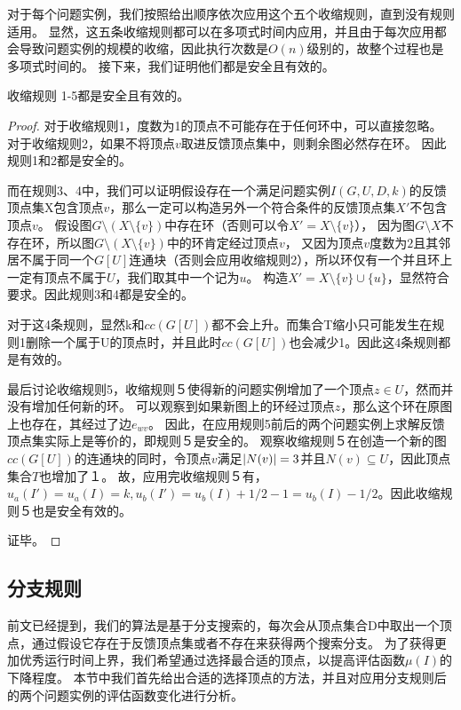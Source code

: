 对于每个问题实例，我们按照给出顺序依次应用这个五个收缩规则，直到没有规则适用。
显然，这五条收缩规则都可以在多项式时间内应用，并且由于每次应用都会导致问题实例的规模的收缩，因此执行次数是$O(n)$级别的，故整个过程也是多项式时间的。
接下来，我们证明他们都是安全且有效的。

\begin{lemma}
收缩规则 1-5都是安全且有效的。
\end{lemma}
\begin{proof}
对于收缩规则1，度数为1的顶点不可能存在于任何环中，可以直接忽略。
对于收缩规则2，如果不将顶点$v$取进反馈顶点集中，则剩余图必然存在环。
因此规则1和2都是安全的。

而在规则3、4中，我们可以证明假设存在一个满足问题实例$I(G, U, D, k)$的反馈顶点集X包含顶点$v$，那么一定可以构造另外一个符合条件的反馈顶点集$X'$不包含顶点$v$。
假设图$G \setminus (X \setminus \{v\})$中存在环（否则可以令$X' = X \setminus \{v\}$），
因为图$G \setminus X$不存在环，所以图$G \setminus (X \setminus \{v\})$中的环肯定经过顶点$v$，
又因为顶点$v$度数为$2$且其邻居不属于同一个$G[U]$连通块（否则会应用收缩规则2），所以环仅有一个并且环上一定有顶点不属于$U$，我们取其中一个记为$u$。
构造$X' = X \setminus \{v\} \cup \{u\}$，显然符合要求。因此规则3和4都是安全的。

对于这4条规则，显然k和$cc(G[U])$都不会上升。而集合T缩小只可能发生在规则1删除一个属于U的顶点时，并且此时$cc(G[U])$也会减少1。因此这4条规则都是有效的。

最后讨论收缩规则5，收缩规则５使得新的问题实例增加了一个顶点$z \in U$，然而并没有增加任何新的环。
可以观察到如果新图上的环经过顶点$z$，那么这个环在原图上也存在，其经过了边$e_{wv}$。
因此，在应用规则5前后的两个问题实例上求解反馈顶点集实际上是等价的，即规则５是安全的。
观察收缩规则５在创造一个新的图$cc(G[U])$的连通块的同时，令顶点$v$满足$\left\vert N(v) \right\vert = 3$并且$N(v) \subseteq U$，因此顶点集合$T$也增加了１。
故，应用完收缩规则５有，$u_a(I') = u_a(I) = k, u_b(I') = u_b(I) + 1/2 - 1 = u_b(I) - 1/2$。因此收缩规则５也是安全有效的。

证毕。
\end{proof}


\subsection{分支规则}
前文已经提到，我们的算法是基于分支搜索的，每次会从顶点集合D中取出一个顶点，通过假设它存在于反馈顶点集或者不存在来获得两个搜索分支。
为了获得更加优秀运行时间上界，我们希望通过选择最合适的顶点，以提高评估函数$\mu(I)$的下降程度。
本节中我们首先给出合适的选择顶点的方法，并且对应用分支规则后的两个问题实例的评估函数变化进行分析。

